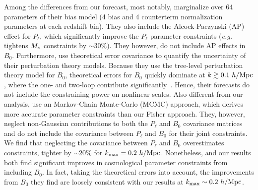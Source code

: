 Among the differences from our forecast, most notably, \cite{chudaykin2019}  
marginalize over 64 parameters of their bias model (4 bias and 4 counterterm 
normalization parameters at each redshift bin). They also include the 
Alcock-Paczynski (AP) effect for $P_\ell$, which significantly improve the 
$P_\ell$ parameter constraints (\emph{e.g.} tightens $M_\nu$ constraints by $\sim30\%$). 
They however, do not include AP effects in $B_0$. Furthermore, 
\cite{chudaykin2019} use theoretical error covariance to quantify the 
uncertainty of their perturbation theory models. Because they use the tree-level 
perturbation theory model for $B_0$, theoretical errors for $B_0$ quickly 
dominate at $k \gtrsim 0.1~h/{\rm Mpc}$, where the one- and two-loop contribute 
significantly~\citep[\emph{e.g.}][]{lazanu2018}. Hence, their forecasts do not include 
the constraining power on nonlinear scales. Also different from our analysis,
\cite{chudaykin2019} use an Markov-Chain Monte-Carlo (MCMC) 
approach, which derives more accurate parameter constraints than our Fisher
approach. They, however, neglect non-Gaussian contributions to both the 
$P_\ell$ and $B_0$ covariance matrices and do not include the covariance 
between $P_\ell$ and $B_0$ for their joint constraints. We find that 
neglecting the covariance between $P_\ell$ and $B_0$ overestimates constraints, 
tighter by ${\sim}20\%$ for $k_{\rm max} = 0.2~h/{\rm Mpc}$. Nonetheless, \cite{chudaykin2019} 
and our results both find significant improves in cosmological parameter 
constraints from including $B_0$. In fact, taking the theoretical errors 
into account, the improvements from $B_0$ they find are loosely consistent 
with our results at $k_{\rm max} \sim  0.2~h/{\rm Mpc}$. 


